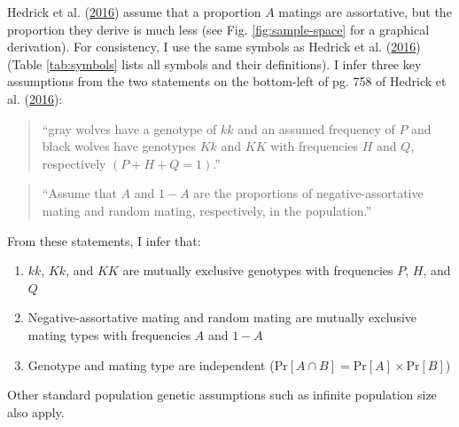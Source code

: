 \documentclass[
]{article}
\providecommand{\tightlist}{%
  \setlength{\itemsep}{0pt}\setlength{\parskip}{0pt}}
\begin{document}
Hedrick et al. (\protect\hyperlink{ref-hedrick_negative-assortative_2016}{2016}) assume that a proportion \(A\) matings are assortative, but the proportion they derive is much less (see Fig. \ref{fig:sample-space} for a graphical derivation). For consistency, I use the same symbols as Hedrick et al. (\protect\hyperlink{ref-hedrick_negative-assortative_2016}{2016}) (Table \ref{tab:symbols} lists all symbols and their definitions). I infer three key assumptions from the two statements on the bottom-left of pg. 758 of Hedrick et al. (\protect\hyperlink{ref-hedrick_negative-assortative_2016}{2016}):

\begin{quote}
``gray wolves have a genotype of \(kk\) and an assumed frequency of \(P\) and black
wolves have genotypes \(Kk\) and \(KK\) with frequencies \(H\) and \(Q\), respectively \((P + H + Q = 1)\).''
\end{quote}

\begin{quote}
``Assume that \(A\) and \(1-A\) are the proportions of negative-assortative mating and random mating, respectively, in the population.''
\end{quote}

From these statements, I infer that:

\begin{enumerate}
\def\labelenumi{\arabic{enumi}.}
\tightlist
\item
  \(kk\), \(Kk\), and \(KK\) are mutually exclusive genotypes with frequencies \(P\), \(H\), and \(Q\)
\item
  Negative-assortative mating and random mating are mutually exclusive mating types with frequencies \(A\) and \(1-A\)
\item
  Genotype and mating type are independent (\(\mathrm{Pr}[A \cap B] = \mathrm{Pr}[A] \times \mathrm{Pr}[B]\))
\end{enumerate}

Other standard population genetic assumptions such as infinite population size also apply.
\end{document}
